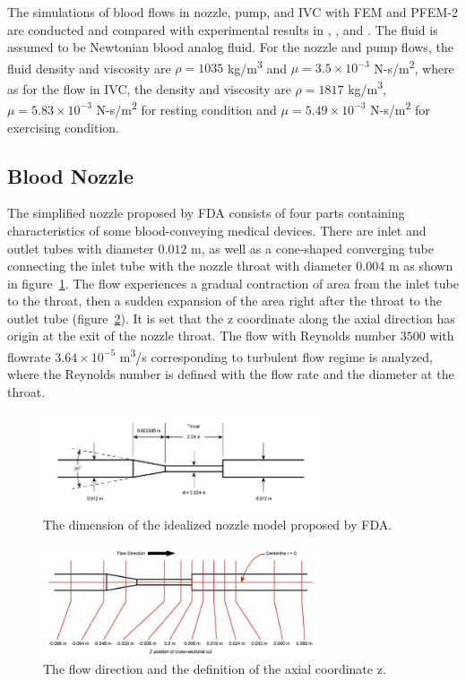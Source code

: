 The simulations of blood flows in nozzle, pump, and IVC with FEM and PFEM-2 are conducted and compared with experimental results in \cite{fda_res}, \cite{fda_nozzle}, \cite{fda_pump} and \cite{gallagher_exp}. The fluid is assumed to be Newtonian blood analog fluid. For the nozzle and pump flows, the fluid density and viscosity are $\rho= 1035$ kg/m\textsuperscript{3} and $\mu =3.5\times10^{-3}$ N-s/m\textsuperscript{2}, where as for the flow in IVC, the density and viscosity are $\rho=1817$ kg/m\textsuperscript{3}, $\mu=5.83\times10^{-3}$ N-s/m\textsuperscript{2} for resting condition and $\mu=5.49\times10^{-3}$ N-s/m\textsuperscript{2} for exercising condition. 

\subsection{Blood Nozzle}

The simplified nozzle proposed by FDA consists of four parts containing characteristics of some blood-conveying medical devices. There are inlet and outlet tubes with diameter $0.012$ m, as well as a cone-shaped converging tube connecting the inlet tube with the nozzle throat with diameter $0.004$ m as shown in figure~\ref{fig:nozzlegeo1}. The flow experiences a gradual contraction of area from the inlet tube to the throat, then a sudden expansion of the area right after the throat to the outlet tube (figure~\ref{fig:nozzlegeo2}). It is set that the z coordinate along the axial direction has origin at the exit of the nozzle throat. The flow with Reynolds number $3500$ with flowrate $3.64\times10^{-5}$ m\textsuperscript{3}/s corresponding to turbulent flow regime is analyzed, where the Reynolds number is defined with the flow rate and the diameter at the throat. 

\begin{figure}[htbp]
    \centering
    \includegraphics[width=3.2in]{imgs/nozzle_pump/nozzle_geo.jpg}
    \caption{The dimension of the idealized nozzle model proposed by FDA.}
    \label{fig:nozzlegeo1}
\end{figure}
\begin{figure}[htbp]
    \centering
    \includegraphics[width=3.2in]{imgs/nozzle_pump/nozzle_CS.jpg}
    \caption{The flow direction and the definition of the axial coordinate z.}
    \label{fig:nozzlegeo2}
\end{figure}


